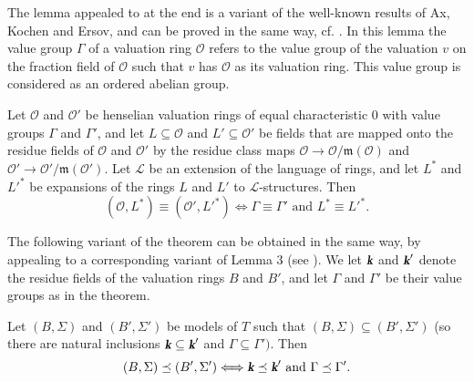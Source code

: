 \documentclass[amalog]{svjour}
\def\k{\text{\fontseries{b}\fontshape{it}\selectfont k}}
\def\Cal#1{{\mathcal #1}}
\def \m{\mathfrak{m}}
\begin{document}
The lemma appealed to at the end is a variant of the well-known results of Ax, Kochen and Ersov, and
can be proved in the same way, cf. \cite{ref1,ref3,ref4}. In this lemma
the value group $\Gamma$ of a valuation ring $\Cal O$
refers to the value group of the valuation $v$ on the fraction field of $\Cal O$ such that
$v$ has $\Cal O$ as its valuation ring. This value group is considered as an ordered abelian group.


\begin{lemma}Let $\Cal O$ and $\Cal O'$ be henselian valuation rings of
equal characteristic
$0$ with value groups $\Gamma$ and $\Gamma'$, and let $L \subseteq \Cal O$ and
$L'\subseteq \Cal O'$ be fields that are mapped onto the
residue fields of $\Cal O$ and $\Cal O'$ by the residue class maps
$\Cal O \to \Cal O/\m(\Cal O)$
and $\Cal O' \to \Cal O'/\m(\Cal O')$. Let $\Cal L$ be an extension of the
language of rings, and
let $L^*$ and ${L'}^*$ be expansions of the rings $L$ and $L'$ to $\Cal
L$-structures. Then
$$ (\Cal O, L^*) \equiv (\Cal O', {L'}^*) \Longleftrightarrow \Gamma
\equiv \Gamma' \text{ and } L^*\equiv {L'}^* .$$
\end{lemma}

The following variant of the theorem can be obtained in the same way,
by appealing to a corresponding variant of Lemma 3 (see \cite{ref4}). We
let $\k$ and $\k'$ denote the residue fields of the valuation rings $B$ and $B'$,
and let $\Gamma$ and $\Gamma'$ be their value groups as in the theorem.

\begin{prop}Let $(B,\Sigma)$ and $(B',\Sigma')$ be models of $T$
such that $(B,\Sigma)\subseteq (B',\Sigma')$ (so there are natural
inclusions $\k \subseteq \k'$ and $\Gamma \subseteq \Gamma')$. Then
$$(B,\Sigma)\preceq (B',\Sigma') \Longleftrightarrow \k\preceq \k'
\text{ and }\Gamma\preceq \Gamma'.$$  \end{prop}
\end{document}
